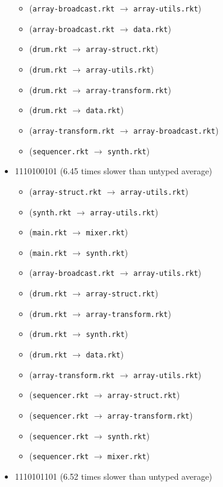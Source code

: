 \documentclass{article}
\newcommand{\mono}[1]{\texttt{#1}}
\begin{document}
\begin{itemize}
\begin{itemize}
  \item (\mono{array-broadcast.rkt} $\rightarrow$ \mono{array-utils.rkt})
  \item (\mono{array-broadcast.rkt} $\rightarrow$ \mono{data.rkt})
  \item (\mono{drum.rkt} $\rightarrow$ \mono{array-struct.rkt})
  \item (\mono{drum.rkt} $\rightarrow$ \mono{array-utils.rkt})
  \item (\mono{drum.rkt} $\rightarrow$ \mono{array-transform.rkt})
  \item (\mono{drum.rkt} $\rightarrow$ \mono{data.rkt})
  \item (\mono{array-transform.rkt} $\rightarrow$ \mono{array-broadcast.rkt})
  \item (\mono{sequencer.rkt} $\rightarrow$ \mono{synth.rkt})
  \end{itemize}
\item 1110100101 (6.45 times slower than untyped average)
  \begin{itemize}
  \item (\mono{array-struct.rkt} $\rightarrow$ \mono{array-utils.rkt})
  \item (\mono{synth.rkt} $\rightarrow$ \mono{array-utils.rkt})
  \item (\mono{main.rkt} $\rightarrow$ \mono{mixer.rkt})
  \item (\mono{main.rkt} $\rightarrow$ \mono{synth.rkt})
  \item (\mono{array-broadcast.rkt} $\rightarrow$ \mono{array-utils.rkt})
  \item (\mono{drum.rkt} $\rightarrow$ \mono{array-struct.rkt})
  \item (\mono{drum.rkt} $\rightarrow$ \mono{array-transform.rkt})
  \item (\mono{drum.rkt} $\rightarrow$ \mono{synth.rkt})
  \item (\mono{drum.rkt} $\rightarrow$ \mono{data.rkt})
  \item (\mono{array-transform.rkt} $\rightarrow$ \mono{array-utils.rkt})
  \item (\mono{sequencer.rkt} $\rightarrow$ \mono{array-struct.rkt})
  \item (\mono{sequencer.rkt} $\rightarrow$ \mono{array-transform.rkt})
  \item (\mono{sequencer.rkt} $\rightarrow$ \mono{synth.rkt})
  \item (\mono{sequencer.rkt} $\rightarrow$ \mono{mixer.rkt})
  \end{itemize}
\item 1110101101 (6.52 times slower than untyped average)

\end{itemize}
\end{document}

